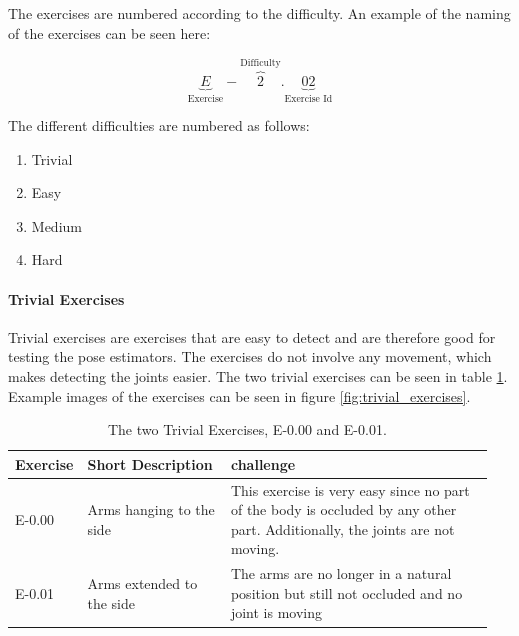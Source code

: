 The exercises are numbered according to the difficulty. An example of the naming of the exercises can be seen here:

\[
    \underbrace{E}_\text{Exercise}-\overbrace{2}^\text{Difficulty}.\underbrace{02}_\text{Exercise Id}
\]

The different difficulties are numbered as follows:

\begin{enumerate}
    \addtocounter{enumi}{-1}
    \item Trivial
    \item Easy
    \item Medium
    \item Hard
\end{enumerate}

\paragraph{Trivial Exercises}

Trivial exercises are exercises that are easy to detect and are therefore good for testing the pose estimators. The exercises do not involve any movement, which makes detecting the joints easier. The two trivial exercises can be seen in table \ref{tab:trivial_exercises}. Example images of the exercises can be seen in figure \ref{fig:trivial_exercises}.

\begin{table}[htb]
  \caption[Trivial Exercises]{The two Trivial Exercises, E-0.00 and E-0.01.}
  \label{tab:trivial_exercises}
  \begin{tabular}{p{0.1\linewidth}p{0.3\linewidth}p{0.55\linewidth}}
  \hline
  Exercise & Short Description         & challenge   \\ \hline
  E-0.00   & Arms hanging to the side  & This exercise is very easy since no part of the body is occluded by any other part. Additionally, the joints are not moving. \\
  E-0.01   & Arms extended to the side & The arms are no longer in a natural position but still not occluded and no joint is moving \\ \hline
  \end{tabular}
\end{table} 

